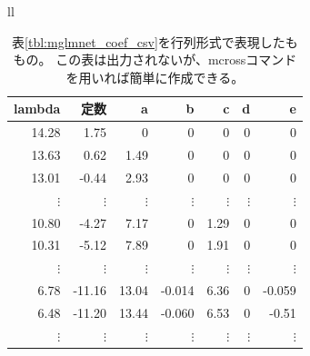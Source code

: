 \begin{table}[htbp]
\begin{center}
\begin{tabular}{ll}
\begin{minipage}{0.5\hsize}
\begin{center}
\caption{
表\ref{tbl:mglmnet_coef_csv}を行列形式で表現したももの。
この表は出力されないが、mcrossコマンドを用いれば簡単に作成できる。
\label{tbl:mglmnet_coef2}}
{\small
\begin{tabular}{rrrrrrr}
\hline
lambda&定数&a&b&c&d&e \\
\hline
  14.28 &   1.75 &   0    &   0    &   0    &   0    &   0     \\
  13.63 &   0.62 &   1.49 &   0    &   0    &   0    &   0     \\
  13.01 &  -0.44 &   2.93 &   0    &   0    &   0    &   0     \\
$\vdots$&$\vdots$&$\vdots$&$\vdots$&$\vdots$&$\vdots$&$\vdots$ \\
  10.80 &  -4.27 &   7.17 &   0    &   1.29 &   0    &   0     \\
  10.31 &  -5.12 &   7.89 &   0    &   1.91 &   0    &   0     \\
$\vdots$&$\vdots$&$\vdots$&$\vdots$&$\vdots$&$\vdots$&$\vdots$ \\
   6.78 & -11.16 &  13.04 & -0.014 &   6.36 &   0    &  -0.059 \\
   6.48 & -11.20 &  13.44 & -0.060 &   6.53 &   0    &  -0.51  \\
$\vdots$&$\vdots$&$\vdots$&$\vdots$&$\vdots$&$\vdots$&$\vdots$ \\
\hline
\end{tabular} 
}
\end{center}
\end{minipage}

\end{tabular} 
\end{center}
\end{table} 



